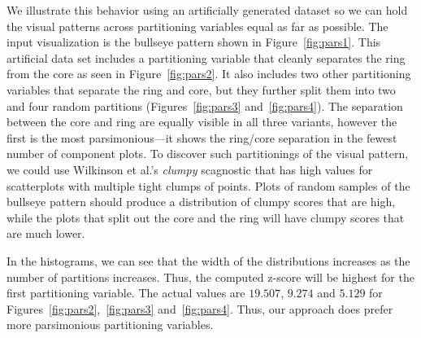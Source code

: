We illustrate this behavior using an artificially generated dataset so we can hold the visual patterns across partitioning variables equal as far as possible. The input visualization is the bullseye pattern shown in Figure~\ref{fig:pars1}. This artificial data set includes a partitioning variable that cleanly separates the ring from the core as seen in Figure~\ref{fig:pars2}. It also includes two other partitioning variables that separate the ring and core, but they further split them into two and four random partitions (Figures~\ref{fig:pars3} and~\ref{fig:pars4}). The separation between the core and ring are equally visible in all three variants, however the first is the most parsimonious---it shows the ring/core separation in the fewest number of component plots. 
To discover such partitionings of the visual pattern, we could use Wilkinson et al.'s \emph{clumpy} scagnostic that has high values for scatterplots with multiple tight clumps of points. Plots of random samples of the bullseye pattern should produce a distribution of clumpy scores that are high, while the plots that split out the core and the ring will have clumpy scores that are much lower.

In the histograms, we can see that the width of the distributions increases as the number of partitions increases. Thus, the computed z-score will be highest for the first partitioning variable. The actual values are $19.507$, $9.274$ and $5.129$ for Figures~\ref{fig:pars2},~\ref{fig:pars3} and~\ref{fig:pars4}. Thus, our approach does prefer more parsimonious partitioning variables.


